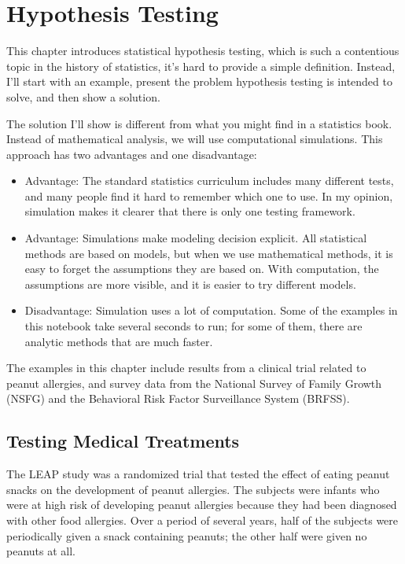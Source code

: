 \chapter{Hypothesis Testing}\label{hypothesis-testing}

This chapter introduces statistical hypothesis testing, which is such a
contentious topic in the history of statistics, it's hard to provide a
simple definition. Instead, I'll start with an example, present the
problem hypothesis testing is intended to solve, and then show a
solution.

The solution I'll show is different from what you might find in a
statistics book. Instead of mathematical analysis, we will use
computational simulations. This approach has two advantages and one
disadvantage:

\begin{itemize}
\item
  Advantage: The standard statistics curriculum includes many different
  tests, and many people find it hard to remember which one to use. In
  my opinion, simulation makes it clearer that there is only one testing
  framework.
\item
  Advantage: Simulations make modeling decision explicit. All
  statistical methods are based on models, but when we use mathematical
  methods, it is easy to forget the assumptions they are based on. With
  computation, the assumptions are more visible, and it is easier to try
  different models.
\item
  Disadvantage: Simulation uses a lot of computation. Some of the
  examples in this notebook take several seconds to run; for some of
  them, there are analytic methods that are much faster.
\end{itemize}

The examples in this chapter include results from a clinical trial
related to peanut allergies, and survey data from the National Survey of
Family Growth (NSFG) and the Behavioral Risk Factor Surveillance System
(BRFSS).

\pagebreak

\section{Testing Medical Treatments}\label{testing-medical-treatments}

The LEAP study was a randomized trial that tested the effect of eating
peanut snacks on the development of peanut allergies. The subjects were
infants who were at high risk of developing peanut allergies because
they had been diagnosed with other food allergies. Over a period of
several years, half of the subjects were periodically given a snack
containing peanuts; the other half were given no peanuts at all.

